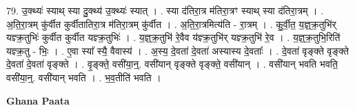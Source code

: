 \documentclass[17pt]{extarticle}
\begin{document}
79. उ॒क्थ्यः॑ स्याथ् स्या दु॒क्थ्य॑ उ॒क्थ्यः॑ स्यात् । . स्या द॑तिरा॒त्र म॑तिरा॒त्रꣳ स्याथ् स्या द॑तिरा॒त्रम् । . अ॒ति॒रा॒त्रम् कु॑र्वीत कुर्वीतातिरा॒त्र म॑तिरा॒त्रम् कु॑र्वीत । . अ॒ति॒रा॒त्रमित्य॑ति - रा॒त्रम् । . कु॒र्वी॒त॒ य॒ज्ञ्॒क्र॒तुभि॑र् यज्ञ्क्र॒तुभिः॑ कुर्वीत कुर्वीत यज्ञ्क्र॒तुभिः॑ । . य॒ज्ञ्॒क्र॒तुभि॑ रे॒वैव य॑ज्ञ्क्र॒तुभि॑र् यज्ञ्क्र॒तुभि॑ रे॒व । . य॒ज्ञ्॒क्र॒तुभि॒रिति॑ यज्ञ्क्र॒तु - भिः॒ । . ए॒वा स्या᳚ स्यै॒ वैवास्य॑ । . अ॒स्य॒ दे॒वता॑ दे॒वता॑ अस्यास्य दे॒वताः᳚ । . दे॒वता॑ वृङ्क्ते वृङ्क्ते दे॒वता॑ दे॒वता॑ वृङ्क्ते । . वृ॒ङ्क्ते॒ वसी॑या॒न्॒. वसी॑यान् वृङ्क्ते वृङ्क्ते॒ वसी॑यान् । . वसी॑यान् भवति भवति॒ वसी॑या॒न्॒. वसी॑यान् भवति । . भ॒व॒तीति॑ भवति । \newline

\textbf{Ghana Paata } \newline
\end{document}
